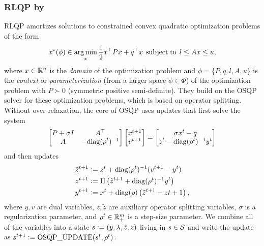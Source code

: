 \documentclass[twoside,11pt]{article}
\begin{document}
\subsubsection{RLQP by \citet{ichnowski2021accelerating}}
\label{sec:apps:qprl}
RLQP \citep{ichnowski2021accelerating} amortizes solutions to constrained
convex quadratic optimization problems of the form
\begin{equation}
  x^\star(\phi)\in \operatorname*{arg\,min}_x \frac{1}{2} x^\top Px+ q^\top x\; \operatorname*{subject\;to}\; l\leq Ax\leq u,
  \label{eq:qp}
\end{equation}
where $x\in\mathbb{R}^n$ is the \emph{domain} of the optimization problem
and $\phi=\{P,q,l,A,u\}$ is the \emph{context} or \emph{parameterization}
(from a larger space $\phi\in\Phi$)
of the optimization problem with $P\succ 0$ (symmetric positive semi-definite).
They build on the OSQP solver \citep{stellato2018osqp} for these
optimization problems, which is based on operator splitting.
Without over-relaxation, the core of OSQP uses updates
that first solve the system
\begin{equation}
  \begin{bmatrix}
    P+\sigma I & A^\top \\
    A & -{\rm diag}(\rho^t)^{-1} \\
  \end{bmatrix}
  \begin{bmatrix}
    x^{t+1} \\
    v^{t+1}
  \end{bmatrix}
  =
  \begin{bmatrix}
    \sigma x^t - q \\
    z^t - {\rm diag}(\rho^t)^{-1} y^t
  \end{bmatrix}
  \label{eq:osqp-system}
\end{equation}
and then updates
\begin{equation}
  \begin{aligned}
  \tilde z^{t+1} &\vcentcolon= z^t+{\rm diag}(\rho^t)^{-1}(v^{t+1}-y^t) \\
  z^{t+1} &\vcentcolon= \Pi\left(\tilde z^{t+1}+{\rm diag}(\rho^t)^{-1}y^t\right) \\
  y^{t+1} &\vcentcolon= x^t + {\rm diag}(\rho)\left(\tilde z^{t+1}-z{t+1}\right),
  \end{aligned}
  \label{eq:osqp-update}
\end{equation}
where $y,v$ are dual variables,
$z,\tilde z$ are auxiliary operator splitting variables,
$\sigma$ is a regularization parameter, and
$\rho^t\in\mathbb{R}^m_+$ is a step-size parameter.
We combine all of the variables into a state
$s\vcentcolon=(y, \lambda, \tilde z, z)$ living in
$s\in{\mathcal{S}}$ and write the update as
$s^{t+1}\vcentcolon={\rm OSQP\_UPDATE}(s^t, \rho^t)$.
\end{document}
